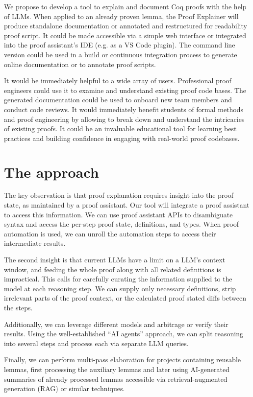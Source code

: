 \documentclass[letterpaper]{article}
\begin{document}
We propose to develop a tool to explain and document Coq proofs with
the help of LLMs. When applied to an already proven lemma, the Proof
Explainer will produce standalone documentation or annotated and
restructured for readability proof script. It could be made accessible
via a simple web interface or integrated into the proof assistant’s
IDE (e.g. as a VS Code plugin). The command line version could be used
in a build or continuous integration process to generate online
documentation or to annotate proof scripts.

It would be immediately helpful to a wide array of users. Professional
proof engineers could use it to examine and understand existing proof
code bases. The generated documentation could be used to onboard new
team members and conduct code reviews. It would immediately benefit
students of formal methods and proof engineering by allowing to break
down and understand the intricacies of existing proofs. It could be an
invaluable educational tool for learning best practices and building
confidence in engaging with real-world proof codebases.

\section*{The approach}

The key observation is that proof explanation requires insight into
the proof state, as maintained by a proof assistant. Our tool will
integrate a proof assistant to access this information. We can use
proof assistant APIs to disambiguate syntax and access the per-step
proof state, definitions, and types. When proof automation is used, we
can unroll the automation steps to access their intermediate results.

The second insight is that current LLMs have a limit on a LLM’s
context window, and feeding the whole proof along with all related
definitions is impractical. This calls for carefully curating the
information supplied to the model at each reasoning step. We can
supply only necessary definitions, strip irrelevant parts of the proof
context, or the calculated proof stated diffs between the steps.

Additionally, we can leverage different models and arbitrage or verify
their results. Using the well-established “AI agents” approach, we can
split reasoning into several steps and process each via separate LLM
queries.

Finally, we can perform multi-pass elaboration for projects containing
reusable lemmas, first processing the auxiliary lemmas and later using
AI-generated summaries of already processed lemmas accessible via
retrieval-augmented generation (RAG) or similar techniques.
\end{document}
